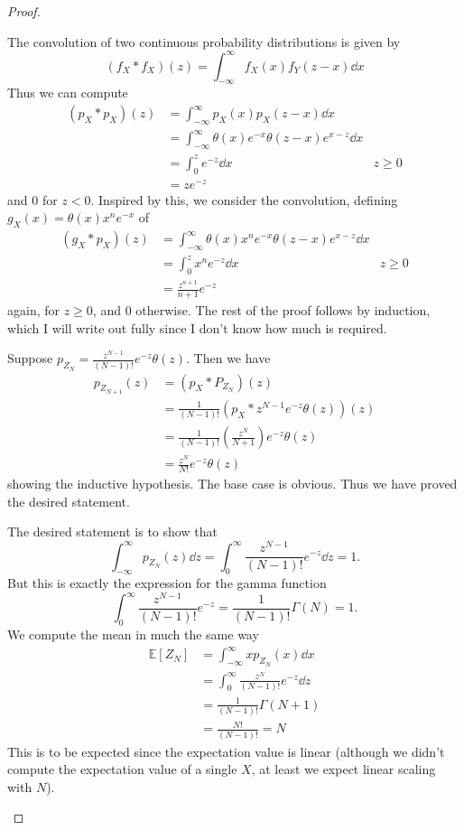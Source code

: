 \begin{proof}
	\begin{parts}
		\item The convolution of two continuous probability distributions is given by
		\[(f_X* f_X)(z)=\int_{-\infty}^\infty f_X(x)f_Y(z-x)\dd{x}\]
		Thus we can compute
		\begin{align*}
			(p_X*p_X)(z) &= \int_{-\infty}^\infty p_X(x)p_X(z-x)\dd{x}\\
			&= \int_{-\infty}^\infty \theta(x)e^{-x}\theta(z-x)e^{x-z}\dd{x}\\
			&= \int_0^z e^{-z}\dd{x} & z \ge 0\\
			&= ze^{-z}
		\end{align*}
		and $0$ for $z<0$. Inspired by this, we consider the convolution, defining $g_X(x)=\theta(x) x^n e^{-x}$ of
		\begin{align*}
			(g_X * p_X)(z) &= \int_{-\infty}^\infty \theta(x)x^n e^{-x}\theta(z-x)e^{x-z}\dd{x}\\
			&=\int_0^z x^n e^{-z}\dd{x} & z \ge 0\\
			&= \frac{z^{n+1}}{n+1}e^{-z}
		\end{align*}
		again, for $z\ge 0$, and $0$ otherwise. The rest of the proof follows by induction, which I will write out fully since I don't know how much is required.

		Suppose $p_{Z_N}=\frac{z^{N-1}}{(N-1)!}e^{-z}\theta(z)$. Then we have
		\begin{align*}
			p_{Z_{N+1}}(z) &= (p_X*P_{Z_N})(z)\\
			&= \frac{1}{(N-1)!}(p_X * z^{N-1}e^{-z}\theta(z))(z)\\
			&= \frac{1}{(N-1)!}\left( \frac{z^N}{N+1} \right)e^{-z}\theta(z)\\
			&= \frac{z^N}{N!}e^{-z}\theta(z)
		\end{align*}
		showing the inductive hypothesis. The base case is obvious. Thus we have proved the desired statement.
	\item The desired statement is to show that
		\[
		\int_{-\infty}^\infty p_{Z_N}(z)\dd{z} = \int_0^\infty \frac{z^{N-1}}{(N-1)!}e^{-z}\dd{z} = 1
		.\] 
		But this is exactly the expression for the gamma function
		\[
		\int_0^\infty \frac{z^{N-1}}{(N-1)!}e^{-z} = \frac{1}{(N-1)!}\Gamma(N)=1
		.\] 
		We compute the mean in much the same way
		\begin{align*}
			\mathbb{E}[Z_N] &= \int_{-\infty}^\infty x p_{Z_N}(x)\dd{x}\\
			&= \int_0^\infty \frac{z^N}{(N-1)!}e^{-z}\dd{z}\\
			&= \frac{1}{(N-1)!}\Gamma(N+1)\\
			&= \frac{N!}{(N-1)!}=N
		\end{align*}
		This is to be expected since the expectation value is linear (although we didn't compute the expectation value of a single $X$, at least we expect linear scaling with $N$).


\end{parts}
\end{proof}
